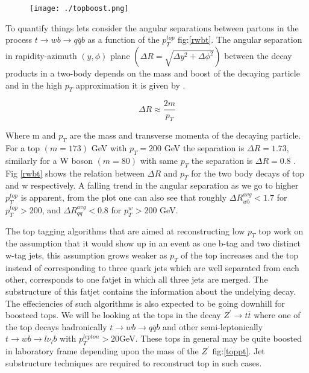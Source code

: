 \documentclass[12pt,a4paper]{article}		%
\begin{document}
 	\begin{figure}[h]
 		\begin{centering}	
 			\texttt{[image: ./topboost.png]} 
 			\caption{}
 			\label{boost}
 			\centering
 		\end{centering} 		
 	\end{figure}   

To quantify things lets consider the angular separations between partons in the process $ t \to w b \to q \bar{q} b$ as a function of the $p_T^{top}$ fig:\ref{rwbt}. The angular separation in rapidity-azimuth $(y, \phi)$ plane $\left(  \Delta R = \sqrt{\Delta y^2 + \Delta \phi^2} \right)$ between the decay products  in a two-body depends on the mass and boost of the decaying particle and in the high $p_T$ approximation it is given by .

\begin{equation}
 \Delta R \approx \frac{2m}{p_T}
\end{equation} 

Where m and $p_T$ are the mass and transverse momenta of the decaying particle. For a top $(m = 173)$ GeV \cite{pdg-top} with $p_T = 200$ GeV the separation is $\Delta R = 1.73 $, similarly for a W boson $(m = 80)$ \cite{pdg-w} with same $p_T$ the separation is $\Delta R = 0.8$ . Fig \ref{rwbt} shows the relation between $\Delta R $ and $p_T$ for the two body decays of top and w respectively. A falling trend in the angular separation as we go to higher $p_T^{top}$  is apparent, from the plot one can also see that roughly $\Delta R_{wb}^{avg} < 1.7$ for $p_T^{top} > 200$, and $\Delta R_{qq}^{avg}< 0.8 $ for $p_T^{w} > 200$ GeV.   

The top tagging algorithms that are aimed at reconstructing low $p_T$ top work on the assumption that it would show up in an event as one b-tag and two distinct w-tag jets, this assumption grows weaker as $p_T$ of the top increases and the top instead of corresponding to three quark jets which are well separated from each other, corresponds to one fatjet in which all three jets are merged. The substructure of this fatjet contains the information about the undelying decay.  The effeciencies of such algorithms is also expected to be going downhill for boosteed tops. We will be looking at the tops in the decay $Z^\prime \to t \bar{t}$ where one of the top decays hadronically $t \to wb \to q\bar{q}b$ and other semi-leptonically $t \to wb \to l \nu_lb$ with $p_T^{lepton} > 20 $GeV. These tops in general may be quite boosted in laboratory frame depending upon the mass of the $Z^\prime$ fig:\ref{toppt}. Jet substructure techniques are required to reconstruct top in such cases.  
   
\end{document}
